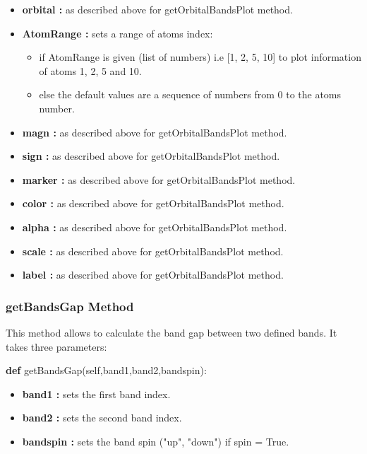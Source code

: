 \documentclass[11pt]{article}
\providecommand{\tightlist}{%
      \setlength{\itemsep}{0pt}\setlength{\parskip}{0pt}}
\newenvironment{Shaded}{}{}
\newcommand{\KeywordTok}[1]{\textcolor[rgb]{0.00,0.44,0.13}{\textbf{{#1}}}}
\newcommand{\NormalTok}[1]{{#1}}
\newcommand{\VariableTok}[1]{\textcolor[rgb]{0.10,0.09,0.49}{{#1}}}
\begin{document}
\begin{itemize}
\item
  \textbf{orbital :} as described above for getOrbitalBandsPlot method.
\item
  \textbf{AtomRange :} sets a range of atoms index:

  \begin{itemize}
  \tightlist
  \item
    if AtomRange is given (list of numbers) i.e {[}1, 2, 5, 10{]} to
    plot information of atoms 1, 2, 5 and 10.
  \item
    else the default values are a sequence of numbers from 0 to the
    atoms number.
  \end{itemize}
\item
  \textbf{magn :} as described above for getOrbitalBandsPlot method.
\item
  \textbf{sign :} as described above for getOrbitalBandsPlot method.
\item
  \textbf{marker :} as described above for getOrbitalBandsPlot method.
\item
  \textbf{color :} as described above for getOrbitalBandsPlot method.
\item
  \textbf{alpha :} as described above for getOrbitalBandsPlot method.
\item
  \textbf{scale :} as described above for getOrbitalBandsPlot method.
\item
  \textbf{label :} as described above for getOrbitalBandsPlot method.
\end{itemize}

\subsubsection{getBandsGap Method}\label{getbandsgap-method}

This method allows to calculate the band gap between two defined bands.
It takes three parameters:

\begin{Shaded}
\begin{Highlighting}[]
\KeywordTok{def} \NormalTok{getBandsGap(}\VariableTok{self}\NormalTok{,band1,band2,bandspin):}
\end{Highlighting}
\end{Shaded}

\begin{itemize}
\tightlist
\item
  \textbf{band1 :} sets the first band index.
\item
  \textbf{band2 :} sets the second band index.
\item
  \textbf{bandspin :} sets the band spin ("up", "down") if spin = True.
\end{itemize}
\end{document}
